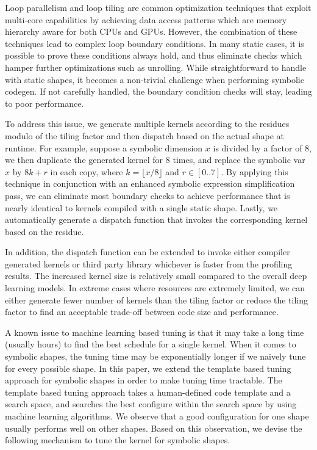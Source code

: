 Loop parallelism and loop tiling are common optimization techniques that exploit multi-core capabilities by achieving data access patterns which
  are memory hierarchy aware for both CPUs and GPUs. However, the combination of these techniques lead to complex loop boundary conditions.
In many static cases, it is possible to prove these conditions always hold, and thus eliminate checks which hamper further optimizations such as unrolling.
While straightforward to handle with static shapes, it becomes a non-trivial challenge when performing symbolic codegen.
If not carefully handled, the boundary condition checks will stay, leading to poor performance.

To address this issue, we generate multiple kernels according to the residues modulo of the tiling
  factor and then dispatch based on the actual shape at runtime.
For example, suppose a symbolic dimension $x$ is divided by a factor of 8, we then duplicate the generated kernel
  for 8 times, and replace the symbolic var $x$ by $8k+r$ in each copy, where $k = \lfloor x / 8 \rfloor$ and $r \in [0..7]$.
By applying this technique in conjunction with an enhanced symbolic expression simplification pass,
  we can eliminate most boundary checks to achieve performance that is nearly identical
  to kernels compiled with a single static shape.
Lastly, we automatically generate a dispatch function that invokes the corresponding kernel based on the residue.

In addition, the dispatch function can be extended to invoke either compiler generated kernels
  or third party library whichever is faster from the profiling results.
The increased kernel size is relatively small compared to the overall deep learning models.
In extreme cases where resources are extremely limited,
  we can either generate fewer number of kernels than the tiling factor
  or reduce the tiling factor to find an acceptable trade-off
  between code size and performance.

A known issue to machine learning based tuning is that it may take a long time (usually hours) to find
  the best schedule for a single kernel.
When it comes to symbolic shapes, the tuning time may be exponentially longer if we
  naively tune for every possible shape.
In this paper, we extend the template based tuning approach for
  symbolic shapes in order to make tuning time tractable.
The template based tuning approach takes a human-defined
  code template and a search space, and searches the best configure
  within the search space by using machine learning algorithms.
We observe that a good configuration for one shape usually performs
  well on other shapes.
Based on this observation, we devise the following mechanism
  to tune the kernel for symbolic shapes.


